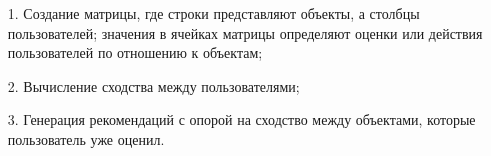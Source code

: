 \begin{enumerate}
	\item[1.] Создание матрицы, где строки представляют объекты, а столбцы пользователей; значения в ячейках матрицы определяют оценки или действия пользователей по отношению к объектам;
	\item[2.] Вычисление сходства между пользователями;
	\item[3.] Генерация рекомендаций с опорой на сходство между объектами, которые пользователь уже оценил. 
\end{enumerate}
\pagebreak